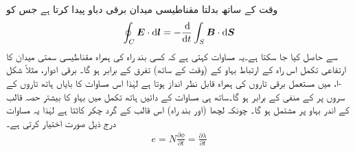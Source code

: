 وقت کے ساتھ بدلتا مقناطیسی میدان برقی دباو پیدا کرتا ہے جس کو 
\begin{align*}
\oint_C\kvec{E}\cdot\dif \kvec{l}=-\frac{\dif}{\dif t}\int_S\kvec{B}\cdot\dif \kvec{S}
\end{align*}
 سے حاصل کیا جا سکتا ہے۔یہ مساوات کہتی ہے کہ کسی بند راہ کی ہمراہ مقناطیسی سمتی میدان  کا ارتفاعی تکمل اس راہ کے ارتباط بہاو کے  (وقت کے ساتھ) تفرق کے برابر ہو گا۔ برقی ادوار، مثلاً شکل -ا،  میں مستعمل برقی تاروں  کی ہمراہ  قابل نظر انداز ہوتا ہے لہٰذا اس مساوات کا بایاں ہاتھ تاروں کے سروں پر    کے منفی کے برابر ہو گا۔ساتھ ہی مساوات کے دائیں ہاتھ تکمل میں بہاو کا بیشتر حصہ قالب کے اندر بہاو  پر مشتمل ہو گا۔ چونکہ لچھا (اور بند راہ)  اس قالب کے گرد  چکر کاٹتا ہے لہٰذا  یہ مساوات درج ذیل صورت اختیار کرتی ہے۔ 
\begin{align}\label{مساوات_مقناطیسی_دور_فیراڈے_قانون}
e=N \frac{\partial \phi}{\partial t} =\frac{\partial \lambda}{\partial t}
\end{align}

